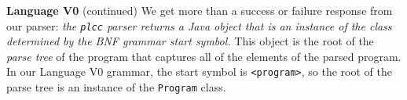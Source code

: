 \begin{minipage}[t]{\sw}
\slidenumber
\LARGE
{\bf Language V0} (continued)\exx
We get more than a success or failure response from our parser:
{\em the \verb'plcc' parser returns a Java object
that is an instance of the class determined by the BNF grammar start symbol.}
This object is the root of the {\em parse tree} of the program
that captures all of the elements of the parsed program.\exx
In our Language V0 grammar,
the start symbol is \verb'<program>',
so the root of the parse tree is an instance
of the \verb'Program' class.\exx
\end{minipage}
\clearpage
